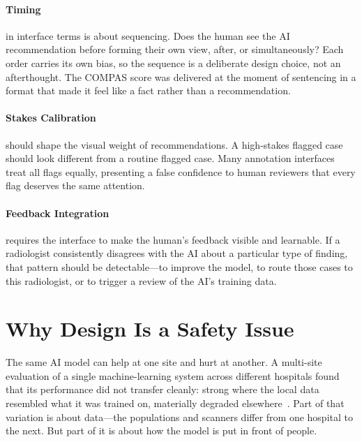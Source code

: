 \paragraph{Timing} in interface terms is about sequencing. Does the human see the AI recommendation before forming their own view, after, or simultaneously? Each order carries its own bias, so the sequence is a deliberate design choice, not an afterthought. The COMPAS score was delivered at the moment of sentencing in a format that made it feel like a fact rather than a recommendation.

\paragraph{Stakes Calibration} should shape the visual weight of recommendations. A high-stakes flagged case should look different from a routine flagged case. Many annotation interfaces treat all flags equally, presenting a false confidence to human reviewers that every flag deserves the same attention.

\paragraph{Feedback Integration} requires the interface to make the human's feedback visible and learnable. If a radiologist consistently disagrees with the AI about a particular type of finding, that pattern should be detectable---to improve the model, to route those cases to this radiologist, or to trigger a review of the AI's training data.

\section{Why Design Is a Safety Issue}
\label{sec:ch6-safety}

The same AI model can help at one site and hurt at another. A multi-site evaluation of a single machine-learning system across different hospitals found that its performance did not transfer cleanly: strong where the local data resembled what it was trained on, materially degraded elsewhere~\autocite{yang2022generalizability}. Part of that variation is about data---the populations and scanners differ from one hospital to the next. But part of it is about how the model is put in front of people.

